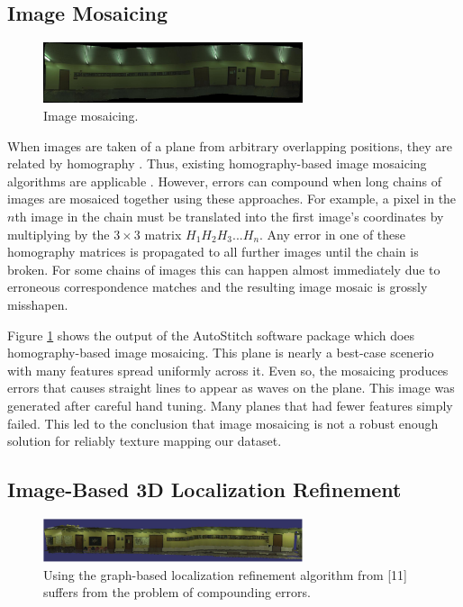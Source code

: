 \documentclass[10pt,twocolumn,letterpaper]{article}
\begin{document}
\subsection{Image Mosaicing}

\begin{figure}
  \centering
  \includegraphics[width=3in]{panoMy.jpg}
  \caption{Image mosaicing. }
  \label{fig:mosaic}
\end{figure}


When images are taken of a plane from arbitrary overlapping positions,
they are related by homography \cite{hz}. Thus, existing
homography-based image mosaicing algorithms are applicable
\cite{brown2007automatic}. However, errors can compound when long
chains of images are mosaiced together using these approaches. For
example, a pixel in the $n$th image in the chain must be translated
into the first image's coordinates by multiplying by the $3\times3$
matrix $H_1 H_2 H_3 ... H_n$. Any error in one of these homography
matrices is propagated to all further images until the chain is
broken. For some chains of images this can happen almost immediately
due to erroneous correspondence matches and the resulting image mosaic
is grossly misshapen.

Figure \ref{fig:mosaic} shows the output of the AutoStitch software
package which does homography-based image mosaicing. This plane is
nearly a best-case scenerio with many features spread uniformly across
it. Even so, the mosaicing produces errors that causes straight lines
to appear as waves on the plane. This image was generated after
careful hand tuning. Many planes that had fewer features simply
failed. This led to the conclusion that image mosaicing is not a
robust enough solution for reliably texture mapping our dataset.

\subsection{Image-Based 3D Localization Refinement}

\begin{figure}
  \centering
  \includegraphics[width=3in]{Graph_crop.pdf}
  \caption{Using the graph-based localization refinement algorithm
    from [11] suffers from the problem of compounding errors. }
  \label{fig:graph}
\end{figure}
\end{document}
